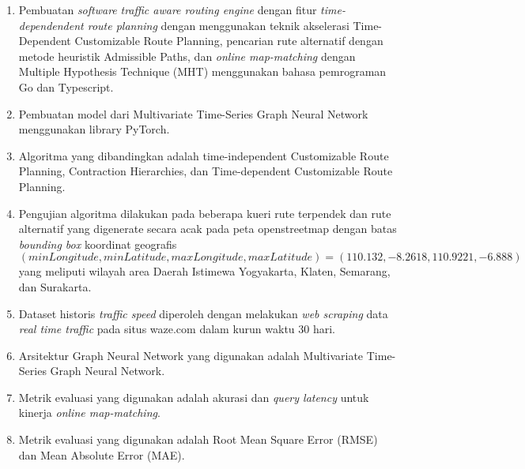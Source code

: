 \begin{enumerate}
    \item Pembuatan \textit{software} \textit{traffic aware routing engine} dengan fitur \textit{time-dependendent route planning} dengan menggunakan teknik akselerasi Time-Dependent Customizable Route Planning, pencarian rute alternatif dengan metode heuristik Admissible Paths, dan \textit{online map-matching } dengan Multiple Hypothesis Technique (MHT) menggunakan bahasa pemrograman Go dan Typescript.
    \item Pembuatan model dari Multivariate Time-Series Graph Neural Network menggunakan library PyTorch.
    \item Algoritma yang dibandingkan adalah time-independent Customizable Route Planning, Contraction Hierarchies, dan Time-dependent Customizable Route Planning.
    \item Pengujian algoritma dilakukan pada beberapa kueri rute terpendek dan rute alternatif yang digenerate secara acak pada peta openstreetmap dengan batas \textit{bounding box} koordinat geografis $(minLongitude,minLatitude,maxLongitude,maxLatitude)=(110.132,-8.2618,110.9221,-6.888)$ yang meliputi wilayah area Daerah Istimewa Yogyakarta, Klaten, Semarang, dan Surakarta. 
    \item Dataset historis \textit{traffic speed} diperoleh dengan melakukan \textit{web scraping} data \textit{real time traffic} pada situs waze.com dalam kurun waktu 30 hari.
    \item Arsitektur Graph Neural Network yang digunakan adalah Multivariate Time-Series Graph Neural Network.
    \item Metrik evaluasi yang digunakan adalah akurasi dan \textit{query latency} untuk kinerja \textit{online map-matching}.
    \item Metrik evaluasi yang digunakan adalah Root Mean Square Error (RMSE) dan Mean Absolute Error (MAE).
\end{enumerate}
